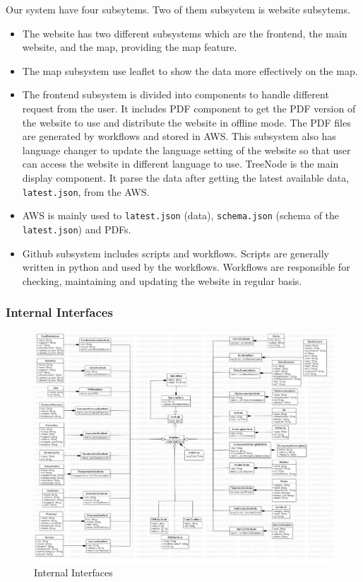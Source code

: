 Our system have four subsytems. Two of them subsystem is website subsytems.
\begin{itemize}
  \item The website has two different subsystems which are the frontend, the main website, and the map, providing the map feature.
  \item The map subsystem use leaflet to show the data more effectively on the map.
  \item The frontend subsystem is divided into components to handle different request from the user.
  \subitem It includes PDF component to get the PDF version of the website to use and distribute the website in offline mode. The PDF files are generated by workflows and stored in AWS.
  \subitem This subsystem also has language changer to update the language setting of the website so that user can access the website in different language to use.
  \subitem TreeNode is the main display component. It parse the data after getting the latest available data, \texttt{latest.json}, from the AWS.
  \item AWS is mainly used to \texttt{latest.json} (data), \texttt{schema.json} (schema of the \texttt{latest.json}) and PDFs.
  \item Github subsystem includes scripts and workflows. Scripts are generally written in python and used by the workflows. Workflows are responsible for checking, maintaining and updating the website in regular basis.
\end{itemize}

\subsubsection{Internal Interfaces}

\begin{figure}[H]
  \centering
  \includegraphics[width=\linewidth]{img/internal-interfaces-diagram.jpg}
  \caption{Internal Interfaces}
\end{figure}

